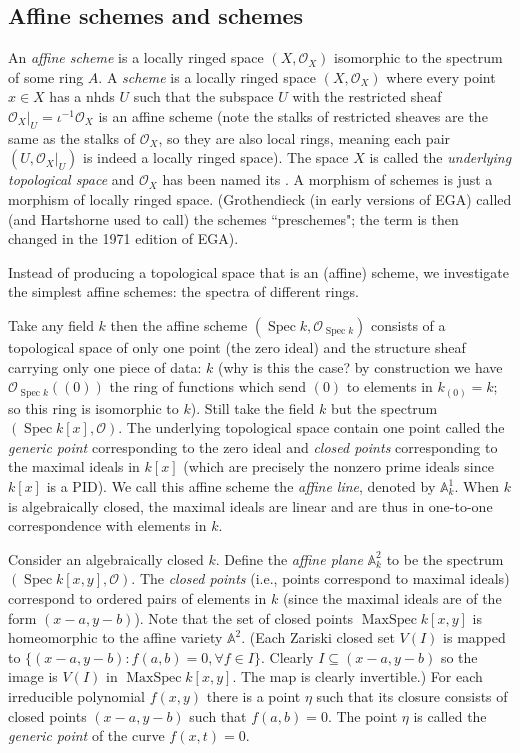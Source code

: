 \documentclass[12pt]{article}
\theoremstyle{remark}
\newcommand{\Spec}[0]{\operatorname{Spec}}
\newcommand{\MaxSpec}[0]{\operatorname{MaxSpec}}
\begin{document}
	\subsection{Affine schemes and schemes}\label{ssec-scheme}
	An \textit{affine scheme} is a locally ringed space $(X,\mathscr O_X)$ isomorphic to the spectrum of some ring $A$. A \textit{scheme} is a locally ringed space $(X,\mathscr O_X)$ where every point $x\in X$ has a nhds $U$ such that the subspace $U$ with the restricted sheaf $\mathscr O_X|_U=\iota^{-1}\mathscr O_X$ is an affine scheme (note the stalks of restricted sheaves are the same as the stalks of $\mathscr O_X$, so they are also local rings, meaning each pair $(U, \mathscr O_X|_U)$ is indeed a locally ringed space). The space $X$ is called the \textit{underlying topological space} and $\mathscr O_X$ has been named its . A morphism of schemes is just a morphism of locally ringed space. (Grothendieck (in early versions of EGA) called (and Hartshorne used to call) the schemes ``preschemes"; the term is then changed in the 1971 edition of EGA).
	
	Instead of producing a topological space that is an (affine) scheme, we investigate the simplest  affine schemes: the spectra of different rings. 
	
	Take any field $k$ then the affine scheme $(\Spec k, \mathscr O_{\Spec k})$ consists of a topological space of only one point (the zero ideal) and the structure sheaf carrying only one piece of data: $k$ (why is this the case? by construction we have $\mathscr O_{\Spec k}((0))$ the ring of functions which send $(0)$ to elements in $k_{(0)}=k$; so this ring is isomorphic to $k$). Still take the field $k$ but the spectrum $(\Spec k[x], \mathscr O)$. The underlying topological space contain one point called the \textit{generic point} corresponding to the zero ideal and \textit{closed points} corresponding to the maximal ideals in $k[x]$ (which are precisely the nonzero prime ideals since $k[x]$ is a PID). We call this affine scheme the \textit{affine line}, denoted by $\mathbb A_k^1$. When $k$ is algebraically closed, the maximal ideals are linear and are thus in one-to-one correspondence with elements in $k$.
	
	Consider an algebraically closed $k$. Define the \textit{affine plane} $\mathbb A^2_k$ to be the spectrum $(\Spec k[x, y], \mathscr O)$. The \textit{closed points} (i.e., points correspond to maximal ideals) correspond to ordered pairs of elements in $k$ (since the maximal ideals are of the form $(x-a, y-b)$). Note that the set of closed points $\MaxSpec k[x, y]$ is homeomorphic to the affine variety $\mathbb A^2$. (Each Zariski closed set $V(I)$ is mapped to $\{(x-a, y-b):f(a, b)=0,\forall f\in I\}$. Clearly $I\subseteq (x-a, y-b)$ so the image is $V(I)$ in $\MaxSpec k[x, y]$. The map is clearly invertible.) For each irreducible polynomial $f(x, y)$ there is a point $\eta$ such that its closure consists of closed points $(x-a, y-b)$ such that $f(a, b)=0$. The point $\eta$ is called the \textit{generic point} of the curve $f(x, t)=0$.
	
\end{document}
